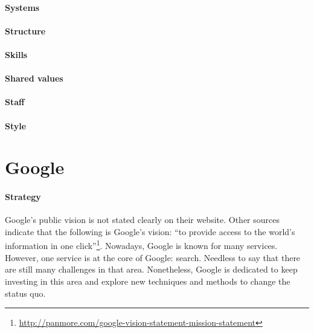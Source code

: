 \paragraph{Systems}

\paragraph{Structure}

\paragraph{Skills}

\paragraph{Shared values}

\paragraph{Staff}

\paragraph{Style}


\section{Google}

\paragraph{Strategy}
Google's public vision is not stated clearly on their website. Other sources indicate that the following is Google's vision: ``to provide access to the world’s information in one click''\footnote{\url{http://panmore.com/google-vision-statement-mission-statement}}. Nowadays, Google is known for many services. However, one service is at the core of Google: search. Needless to say that there are still many challenges in that area. Nonetheless, Google is dedicated to keep investing in this area and explore new techniques and methods to change the status quo.

